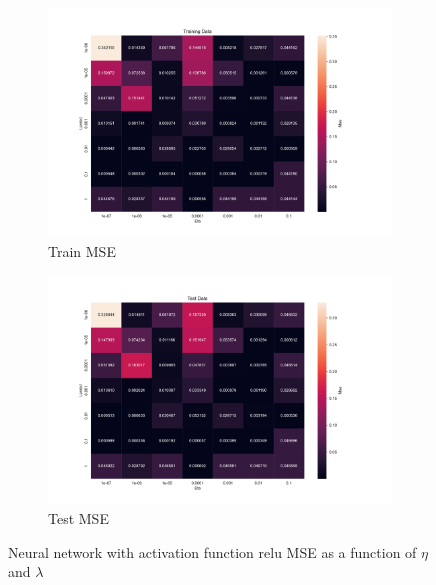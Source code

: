 \begin{figure}[htpb]
\begin{subfigure}{.5\textwidth}
  \centering
  \includegraphics[width=1.2\linewidth]{Figures/PartB/train_relu_MSE(eta,lmb)}
  \caption{Train MSE}
  \label{fig:train_relu_MSE-eta-lmb-}
\end{subfigure}%
\begin{subfigure}{.5\textwidth}
  \centering
  \includegraphics[width=1.2\linewidth]{Figures/PartB/test_relu_MSE(eta,lmb)}
  \caption{Test MSE}
  \label{fig:test_relu_MSE-eta-lmb-}
\end{subfigure}
\caption{Neural network with activation function relu MSE as a function of \(\eta \) and \(\lambda \) }
\label{fig:relu_MSE}
\end{figure}

